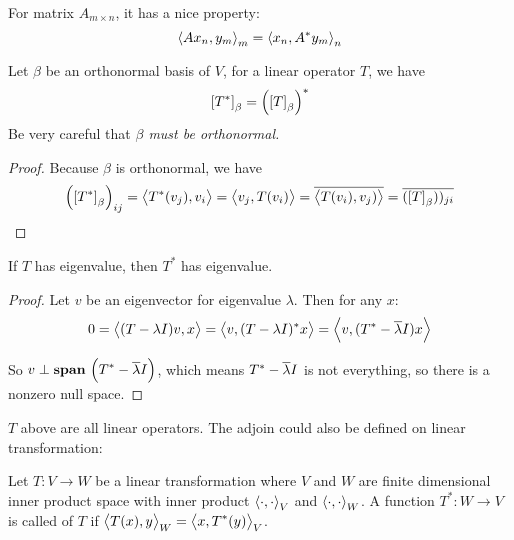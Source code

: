 For matrix $A_{m \times n}$, it has a nice property:
\begin{equation}
    \innerproduct{A x_n}{y_m}_m = \innerproduct{x_n}{A^* y_m}_n
\end{equation}

\begin{theorem}\label{operator_conjugate_transpose_requirement}
    Let $\beta$ be an orthonormal basis of $V$, for a linear operator $T$, we have
    \begin{equation}
        \coordinate{T^*}_\beta = \mleft(\coordinate{T}_\beta\mright)^*
    \end{equation}
    Be very careful that \emph{$\beta$ must be orthonormal.}
\end{theorem}
\begin{proof}
    Because $\beta$ is orthonormal, we have
    \begin{equation*}
        \mleft(\coordinate{T^*}_\beta\mright)_{ij} = \innerproduct{T^* (v_j)}{v_i} = \innerproduct{v_j}{T(v_i)} = \conjugate{\innerproduct{T(v_i)}{v_j)}} = \conjugate{(\coordinate{T}_\beta))_{ji}}
    \end{equation*}
\end{proof}



\begin{theorem}\label{congjugate_transpose_has_eigenvalue}
    If $T$ has eigenvalue, then $T^*$ has eigenvalue.    
\end{theorem}
\begin{proof}
    Let $v$ be an eigenvector for eigenvalue $\lambda$. Then for any $x$:
    \begin{equation*}
        0 = \innerproduct{(T-\lambda I)v}{x} = \innerproduct{v}{(T-\lambda I)^* x} = \innerproduct{v}{(T^* - \conjugate{\lambda}I) x}
    \end{equation*}
    
    So $v \perp \spanset{T^* - \conjugate{\lambda}I}$, which means $T^* - \overline{\lambda}I$ is not everything, so there is a nonzero null space.
\end{proof}


$T$ above are all linear operators. The adjoin could also be defined on linear transformation:

\begin{definition}
    Let $T : V \rightarrow W$ be a linear transformation where $V$ and $W$ are finite dimensional inner product space with inner product $\innerproduct{\cdot{}}{\cdot{}}_V$ and $\innerproduct{\cdot{}}{\cdot{}}_W$. A function $T^* : W \rightarrow V$ is called  of $T$ if $\innerproduct{T(x)}{y}_W = \innerproduct{x}{T^*(y)}_V$.
\end{definition}

